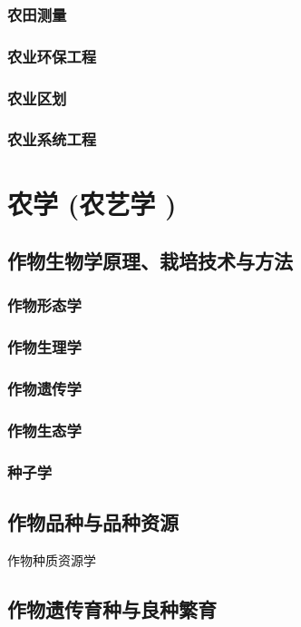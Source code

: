 \documentclass[UTF8]{../ApplicationUniverse}
\begin{document}
\subsection{农田测量}
\subsection{农业环保工程}
\subsection{农业区划}
\subsection{农业系统工程}









\chapter{农学 (农艺学 )}
\section{作物生物学原理、栽培技术与方法}
\subsection{作物形态学}
\subsection{作物生理学}
\subsection{作物遗传学}
\subsection{作物生态学}
\subsection{种子学}

\section{作物品种与品种资源}
作物种质资源学
\section{作物遗传育种与良种繁育}
\end{document}
